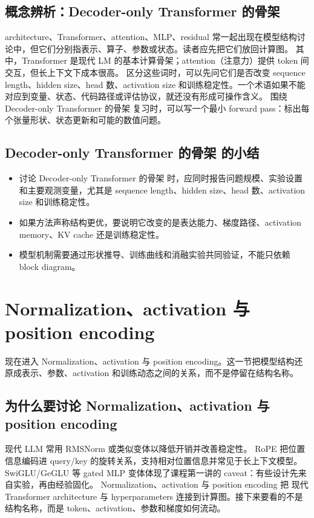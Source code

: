 \documentclass[a4paper]{article}
\begin{document}
\subsection{概念辨析：Decoder-only Transformer 的骨架}
architecture、Transformer、attention、MLP、residual 常一起出现在模型结构讨论中，但它们分别指表示、算子、参数或状态。读者应先把它们放回计算图。
其中，Transformer 是现代 LM 的基本计算骨架；attention（注意力）提供 token 间交互，但长上下文下成本很高。
区分这些词时，可以先问它们是否改变 sequence length、hidden size、head 数、activation size 和训练稳定性。一个术语如果不能对应到变量、状态、代码路径或评估协议，就还没有形成可操作含义。
围绕 Decoder-only Transformer 的骨架 复习时，可以写一个最小 forward pass：标出每个张量形状、状态更新和可能的数值问题。
\subsection{Decoder-only Transformer 的骨架 的小结}
\begin{itemize}
\item 讨论 Decoder-only Transformer 的骨架 时，应同时报告问题规模、实验设置和主要观测变量，尤其是 sequence length、hidden size、head 数、activation size 和训练稳定性。
\item 如果方法声称结构更优，要说明它改变的是表达能力、梯度路径、activation memory、KV cache 还是训练稳定性。
\item 模型机制需要通过形状推导、训练曲线和消融实验共同验证，不能只依赖 block diagram。
\end{itemize}
\section{Normalization、activation 与 position encoding}
现在进入 Normalization、activation 与 position encoding。这一节把模型结构还原成表示、参数、activation 和训练动态之间的关系，而不是停留在结构名称。
\subsection{为什么要讨论 Normalization、activation 与 position encoding}
现代 LLM 常用 RMSNorm 或类似变体以降低开销并改善稳定性。
RoPE 把位置信息编码进 query/key 的旋转关系，支持相对位置信息并常见于长上下文模型。
SwiGLU/GeGLU 等 gated MLP 变体体现了课程第一讲的 caveat：有些设计先来自实验，再由经验固化。
Normalization、activation 与 position encoding 把 现代 Transformer architecture 与 hyperparameters 连接到计算图。接下来要看的不是结构名称，而是 token、activation、参数和梯度如何流动。
\end{document}

